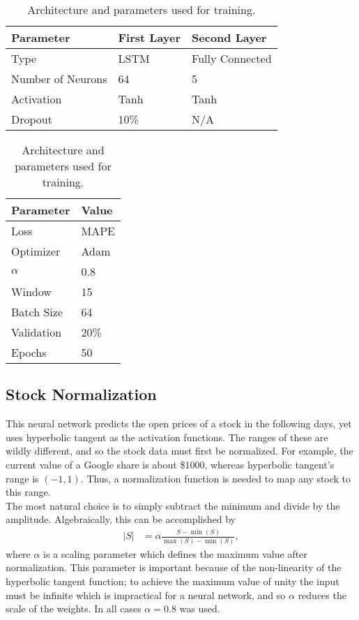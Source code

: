 \documentclass[12pt]{article}
\begin{document}
\begin{table}[htbp]
\begin{subtable}{0.67\textwidth}
\centering
\begin{tabular}{|l | l | l|}
\hline
Parameter & First Layer & Second Layer \\
\hline
Type & LSTM & Fully Connected \\
Number of Neurons & 64 & 5 \\
Activation & Tanh & Tanh \\
Dropout & 10\% & N/A \\
\hline
\end{tabular}
\caption{Architecture of network.}
\end{subtable}
\begin{subtable}{0.33\textwidth}
\centering
\begin{tabular}{|l | l|}
\hline
Parameter & Value \\
\hline
Loss & MAPE \\
Optimizer & Adam \\
$\alpha$ & 0.8 \\
Window & 15 \\
Batch Size & 64 \\
Validation & 20\% \\
Epochs & 50 \\
\hline
\end{tabular}
\caption{Parameters used for training.}
\label{tab:train}
\end{subtable}
\caption{Architecture and parameters used for training.}
\label{tab:param}
\end{table}

\subsection{Stock Normalization}

This neural network predicts the open prices of a stock in the following days, yet uses hyperbolic tangent as the activation functions. The ranges of these are wildly different, and so the stock data must first be normalized. For example, the current value of a Google share is about \$1000, whereas hyperbolic tangent's range is $(-1, 1)$. Thus, a normalization function is needed to map any stock to this range. \\

The most natural choice is to simply subtract the minimum and divide by the amplitude. Algebraically, this can be accomplished by
\begin{align*}
|S| &= \alpha \frac{S - \min(S)}{\max(S) - \min(S)},
\end{align*}
where $\alpha$ is a scaling parameter which defines the maximum value after normalization. This parameter is important because of the non-linearity of the hyperbolic tangent function; to achieve the maximum value of unity the input must be infinite which is impractical for a neural network, and so $\alpha$ reduces the scale of the weights. In all cases $\alpha = 0.8$ was used. \\
\end{document}
